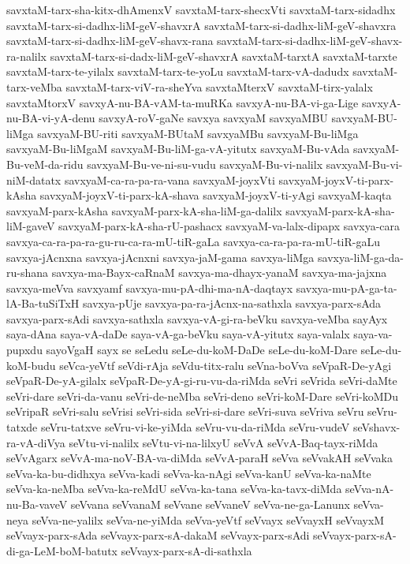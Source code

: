{savxtaM-tarx-sha-kitx-dhAmenxV
savxtaM-tarx-shecxVti
savxtaM-tarx-sidadhx
savxtaM-tarx-si-dadhx-liM-geV-shavxrA
savxtaM-tarx-si-dadhx-liM-geV-shavxra
savxtaM-tarx-si-dadhx-liM-geV-shavx-rana
savxtaM-tarx-si-dadhx-liM-geV-shavx-ra-nalilx
savxtaM-tarx-si-dadx-liM-geV-shavxrA
savxtaM-tarxtA
savxtaM-tarxte
savxtaM-tarx-te-yilalx
savxtaM-tarx-te-yoLu
savxtaM-tarx-vA-dadudx
savxtaM-tarx-veMba
savxtaM-tarx-viV-ra-sheYva
savxtaMterxV
savxtaM-tirx-yalalx
savxtaMtorxV
savxyA-nu-BA-vAM-ta-muRKa
savxyA-nu-BA-vi-ga-Lige
savxyA-nu-BA-vi-yA-denu
savxyA-roV-gaNe
savxya
savxyaM
savxyaMBU
savxyaM-BU-liMga
savxyaM-BU-riti
savxyaM-BUtaM
savxyaMBu
savxyaM-Bu-liMga
savxyaM-Bu-liMgaM
savxyaM-Bu-liM-ga-vA-yitutx
savxyaM-Bu-vAda
savxyaM-Bu-veM-da-ridu
savxyaM-Bu-ve-ni-su-vudu
savxyaM-Bu-vi-nalilx
savxyaM-Bu-vi-niM-datatx
savxyaM-ca-ra-pa-ra-vana
savxyaM-joyxVti
savxyaM-joyxV-ti-parx-kAsha
savxyaM-joyxV-ti-parx-kA-shava
savxyaM-joyxV-ti-yAgi
savxyaM-kaqta
savxyaM-parx-kAsha
savxyaM-parx-kA-sha-liM-ga-dalilx
savxyaM-parx-kA-sha-liM-gaveV
savxyaM-parx-kA-sha-rU-pashacx
savxyaM-va-lalx-dipapx
savxya-cara
savxya-ca-ra-pa-ra-gu-ru-ca-ra-mU-tiR-gaLa
savxya-ca-ra-pa-ra-mU-tiR-gaLu
savxya-jAcnxna
savxya-jAcnxni
savxya-jaM-gama
savxya-liMga
savxya-liM-ga-da-ru-shana
savxya-ma-Bayx-caRnaM
savxya-ma-dhayx-yanaM
savxya-ma-jajxna
savxya-meVva
savxyamf
savxya-mu-pA-dhi-ma-nA-daqtayx
savxya-mu-pA-ga-ta-lA-Ba-tuSiTxH
savxya-pUje
savxya-pa-ra-jAcnx-na-sathxla
savxya-parx-sAda
savxya-parx-sAdi
savxya-sathxla
savxya-vA-gi-ra-beVku
savxya-veMba
sayAyx
saya-dAna
saya-vA-daDe
saya-vA-ga-beVku
saya-vA-yitutx
saya-valalx
saya-va-pupxdu
sayoVgaH
sayx
se
seLedu
seLe-du-koM-DaDe
seLe-du-koM-Dare
seLe-du-koM-budu
seVca-yeVtf
seVdi-rAja
seVdu-titx-ralu
seVna-boVva
seVpaR-De-yAgi
seVpaR-De-yA-gilalx
seVpaR-De-yA-gi-ru-vu-da-riMda
seVri
seVrida
seVri-daMte
seVri-dare
seVri-da-vanu
seVri-de-neMba
seVri-deno
seVri-koM-Dare
seVri-koMDu
seVripaR
seVri-salu
seVrisi
seVri-sida
seVri-si-dare
seVri-suva
seVriva
seVru
seVru-tatxde
seVru-tatxve
seVru-vi-ke-yiMda
seVru-vu-da-riMda
seVru-vudeV
seVshavx-ra-vA-diVya
seVtu-vi-nalilx
seVtu-vi-na-lilxyU
seVvA
seVvA-Baq-tayx-riMda
seVvAgarx
seVvA-ma-noV-BA-va-diMda
seVvA-paraH
seVva
seVvakAH
seVvaka
seVva-ka-bu-didhxya
seVva-kadi
seVva-ka-nAgi
seVva-kanU
seVva-ka-naMte
seVva-ka-neMba
seVva-ka-reMdU
seVva-ka-tana
seVva-ka-tavx-diMda
seVva-nA-nu-Ba-vaveV
seVvana
seVvanaM
seVvane
seVvaneV
seVva-ne-ga-Lanunx
seVva-neya
seVva-ne-yalilx
seVva-ne-yiMda
seVva-yeVtf
seVvayx
seVvayxH
seVvayxM
seVvayx-parx-sAda
seVvayx-parx-sA-dakaM
seVvayx-parx-sAdi
seVvayx-parx-sA-di-ga-LeM-boM-batutx
seVvayx-parx-sA-di-sathxla
}

